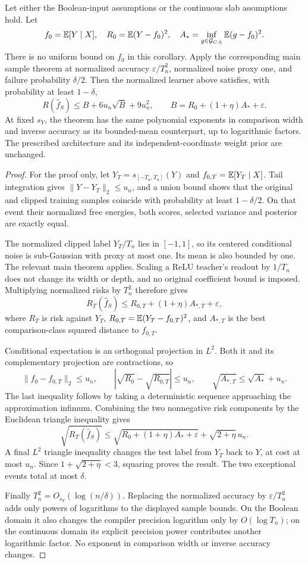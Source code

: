 \begin{corollary}
\label{cor:unbounded-mean-width}
Let either the Boolean-input assumptions or the continuous slab assumptions hold. Let
\[
 f_0=\mathbb E[Y\mid X],\quad R_0=\mathbb E(Y-f_0)^2,
 \quad A_* =\inf_{g\in\mathcal G_{C,h}}\mathbb E(g-f_0)^2.
\]
There is no uniform bound on $f_0$ in this corollary. Apply the corresponding main sample theorem at normalized accuracy $\varepsilon/T_n^2$, normalized noise proxy one, and failure probability $\delta/2$. Then the normalized learner above satisfies, with probability at least $1-\delta$,
\[
 R(\widehat f_S)\le B+6u_n\sqrt B+9u_n^2,
 \qquad B=R_0+(1+\eta)A_*+\varepsilon.
\]
At fixed $s_Y$, the theorem has the same polynomial exponents in comparison width and inverse accuracy as its bounded-mean counterpart, up to logarithmic factors. The prescribed architecture and its independent-coordinate weight prior are unchanged.
\end{corollary}
\begin{proof}
For the proof only, let $Y_T=s_{[-T_n,T_n]}(Y)$ and $f_{0,T}=\mathbb E[Y_T\mid X]$. Tail integration gives
$\|Y-Y_T\|_2\le u_n$, and a union bound shows that the original and clipped training samples coincide with probability at least $1-\delta/2$.
On that event their normalized free energies, both scores, selected variance and posterior are exactly equal.

The normalized clipped label $Y_T/T_n$ lies in $[-1,1]$, so its centered conditional noise is sub-Gaussian with proxy at most one. Its mean is also bounded by one. The relevant main theorem applies. Scaling a ReLU teacher's readout by $1/T_n$ does not change its width or depth, and no original coefficient bound is imposed. Multiplying normalized risks by $T_n^2$ therefore gives
\[
 R_T(\widehat f_S)\le R_{0,T}+(1+\eta)A_{*,T}+\varepsilon,
\]
where $R_T$ is risk against $Y_T$, $R_{0,T}=\mathbb E(Y_T-f_{0,T})^2$, and $A_{*,T}$ is the best comparison-class squared distance to $f_{0,T}$.

Conditional expectation is an orthogonal projection in $L^2$. Both it and its complementary projection are contractions, so
\[
 \|f_0-f_{0,T}\|_2\le u_n,
 \qquad |\sqrt{R_0}-\sqrt{R_{0,T}}|\le u_n,
 \qquad \sqrt{A_{*,T}}\le\sqrt{A_*}+u_n.
\]
The last inequality follows by taking a deterministic sequence approaching the approximation infimum. Combining the two nonnegative risk components by the Euclidean triangle inequality gives
\[
 \sqrt{R_T(\widehat f_S)}
 \le\sqrt{R_0+(1+\eta)A_*+\varepsilon}
          +\sqrt{2+\eta}\,u_n.
\]
A final $L^2$ triangle inequality changes the test label from $Y_T$ back to $Y$, at cost at most $u_n$. Since $1+\sqrt{2+\eta}<3$, squaring proves the result. The two exceptional events total at most $\delta$.

Finally $T_n^2=O_{s_Y}(\log(n/\delta))$. Replacing the normalized accuracy by $\varepsilon/T_n^2$ adds only powers of logarithms to the displayed sample bounds. On the Boolean domain it also changes the compiler precision logarithm only by $O(\log T_n)$; on the continuous domain its explicit precision power contributes another logarithmic factor. No exponent in comparison width or inverse accuracy changes.
\end{proof}

